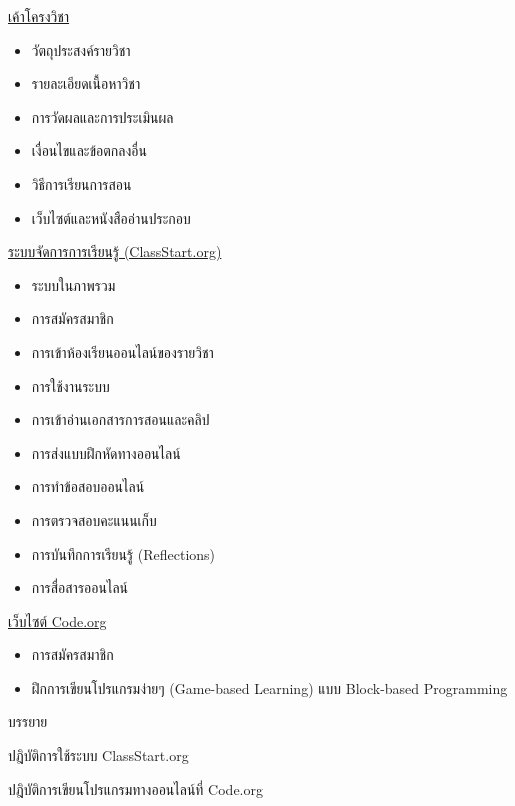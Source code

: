 {
\underline{เค้าโครงวิชา}

\begin{itemize}
\item วัตถุประสงค์รายวิชา
\item รายละเอียดเนื้อหาวิชา
\item การวัดผลและการประเมินผล
\item เงื่อนไขและข้อตกลงอื่น
\item วิธีการเรียนการสอน
\item เว็บไซต์และหนังสืออ่านประกอบ
\end{itemize}

\underline{ระบบจัดการการเรียนรู้ (ClassStart.org)}
\begin{itemize}
\item ระบบในภาพรวม
\item การสมัครสมาชิก
\item การเข้าห้องเรียนออนไลน์ของรายวิชา
\item การใช้งานระบบ
\item การเข้าอ่านเอกสารการสอนและคลิป
\item การส่งแบบฝึกหัดทางออนไลน์
\item การทำข้อสอบออนไลน์
\item การตรวจสอบคะแนนเก็บ
\item การบันทึกการเรียนรู้ (Reflections)
\item การสื่อสารออนไลน์
\end{itemize}

\underline{เว็บไซต์ Code.org}
\begin{itemize}
\item การสมัครสมาชิก
\item ฝึกการเขียนโปรแกรมง่ายๆ (Game-based Learning) แบบ Block-based Programming
\end{itemize}
}
{
\item บรรยาย
\item ปฎิบัติการใช้ระบบ ClassStart.org
\item ปฎิบัติการเขียนโปรแกรมทางออนไลน์ที่ Code.org
}

